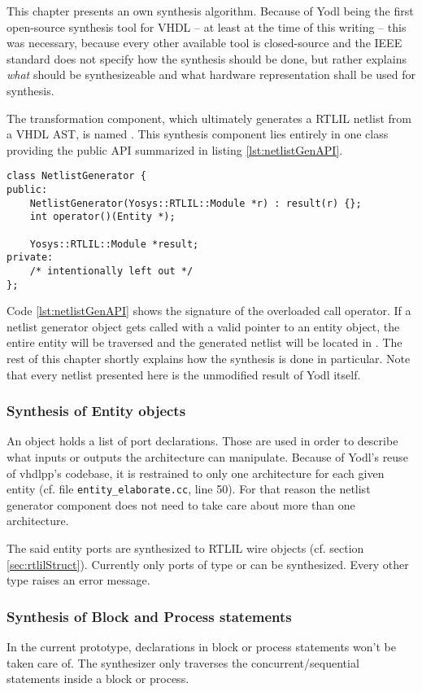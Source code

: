 This chapter presents an own synthesis algorithm. Because of Yodl being
the first open-source synthesis tool for VHDL -- at least at the time of
this writing -- this was necessary, because every other available tool
is closed-source and the IEEE standard \cite{IEEESYNTH} does not
specify how the
synthesis should be done, but rather explains \emph{what} should be
synthesizeable and what hardware representation shall be used for synthesis.

The transformation component, which ultimately generates a RTLIL
netlist from a VHDL AST, is named . This
synthesis component lies entirely in one class providing the
public API summarized in listing \ref{lst:netlistGenAPI}.
%
\begin{lstlisting}[style=c++, caption={Public API of
      NetlistGenerator}, label={lst:netlistGenAPI}]
class NetlistGenerator {
public:
    NetlistGenerator(Yosys::RTLIL::Module *r) : result(r) {};
    int operator()(Entity *);

    Yosys::RTLIL::Module *result;
private:
    /* intentionally left out */
};
\end{lstlisting}
%
Code \ref{lst:netlistGenAPI} shows the signature of the overloaded
call operator. If a netlist generator object gets called with a valid
pointer to an entity object, the entire entity will be traversed and
the generated netlist will be located in . The rest of
this chapter shortly explains how the synthesis is done in particular.
Note that every netlist presented here is the unmodified result of
Yodl itself.

\subsubsection{Synthesis of Entity objects}
An  object holds a list of port declarations. Those are
used in order to describe what inputs or outputs the architecture can
manipulate. Because of Yodl's reuse of vhdlpp's codebase,
it is restrained to only one architecture for each given entity
(cf. file \texttt{entity_elaborate.cc}, line 50). For
that reason the netlist generator component does not need to take care
about more than one architecture.

The said entity ports are synthesized to RTLIL wire objects
(cf. section \ref{sec:rtlilStruct}). Currently
only ports of type  or  can be
synthesized. Every other type raises an error message.

\subsubsection{Synthesis of Block and Process statements}
In the current prototype, declarations in block or process statements
won't be
taken care of. The synthesizer only traverses the
concurrent/sequential statements inside a block or process.

